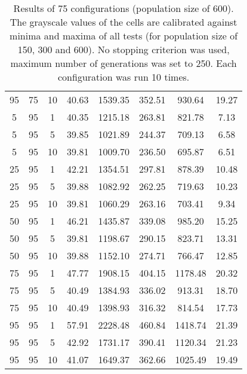 \begin{table}[h]
\begin{tabular}{ccc|c|c|c|c|c}
95 & 75 & 10 & \cellcolor{gray!42}40.63 & \cellcolor{gray!1}1539.35 & \cellcolor{gray!1}352.51 & \cellcolor{gray!1}930.64 & 19.27\\
5 & 95 & 1 & \cellcolor{gray!45}40.35 & \cellcolor{gray!1}1215.18 & \cellcolor{gray!19}263.81 & \cellcolor{gray!5}821.78 & 7.13\\
5 & 95 & 5 & \cellcolor{gray!50}39.85 & \cellcolor{gray!33}1021.89 & \cellcolor{gray!41}244.37 & \cellcolor{gray!41}709.13 & 6.58\\
5 & 95 & 10 & \cellcolor{gray!50}39.81 & \cellcolor{gray!35}1009.70 & \cellcolor{gray!50}236.50 & \cellcolor{gray!45}695.87 & 6.51\\
25 & 95 & 1 & \cellcolor{gray!26}42.21 & \cellcolor{gray!1}1354.51 & \cellcolor{gray!1}297.81 & \cellcolor{gray!1}878.39 & 10.48\\
25 & 95 & 5 & \cellcolor{gray!50}39.88 & \cellcolor{gray!22}1082.92 & \cellcolor{gray!21}262.25 & \cellcolor{gray!37}719.63 & 10.23\\
25 & 95 & 10 & \cellcolor{gray!50}39.81 & \cellcolor{gray!26}1060.29 & \cellcolor{gray!20}263.16 & \cellcolor{gray!42}703.41 & 9.34\\
50 & 95 & 1 & \cellcolor{gray!1}46.21 & \cellcolor{gray!1}1435.87 & \cellcolor{gray!1}339.08 & \cellcolor{gray!1}985.20 & 15.25\\
50 & 95 & 5 & \cellcolor{gray!50}39.81 & \cellcolor{gray!1}1198.67 & \cellcolor{gray!1}290.15 & \cellcolor{gray!5}823.71 & 13.31\\
50 & 95 & 10 & \cellcolor{gray!50}39.88 & \cellcolor{gray!9}1152.10 & \cellcolor{gray!7}274.71 & \cellcolor{gray!23}766.47 & 12.85\\
75 & 95 & 1 & \cellcolor{gray!1}47.77 & \cellcolor{gray!1}1908.15 & \cellcolor{gray!1}404.15 & \cellcolor{gray!1}1178.48 & 20.32\\
75 & 95 & 5 & \cellcolor{gray!44}40.49 & \cellcolor{gray!1}1384.93 & \cellcolor{gray!1}336.02 & \cellcolor{gray!1}913.31 & 18.70\\
75 & 95 & 10 & \cellcolor{gray!44}40.49 & \cellcolor{gray!1}1398.93 & \cellcolor{gray!1}316.32 & \cellcolor{gray!8}814.54 & 17.73\\
95 & 95 & 1 & \cellcolor{gray!1}57.91 & \cellcolor{gray!1}2228.48 & \cellcolor{gray!1}460.84 & \cellcolor{gray!1}1418.74 & 21.39\\
95 & 95 & 5 & \cellcolor{gray!19}42.92 & \cellcolor{gray!1}1731.17 & \cellcolor{gray!1}390.41 & \cellcolor{gray!1}1120.34 & 21.23\\
95 & 95 & 10 & \cellcolor{gray!38}41.07 & \cellcolor{gray!1}1649.37 & \cellcolor{gray!1}362.66 & \cellcolor{gray!1}1025.49 & 19.49
\end{tabular}
\caption{Results of 75 configurations (population size of 600). The grayscale values of the cells are calibrated against minima and maxima of all tests (for population size of 150, 300 and 600). No stopping criterion was used, maximum number of generations was set to 250. Each configuration was run 10 times.}
\label{tab:res3}
\end{table}

\restoregeometry